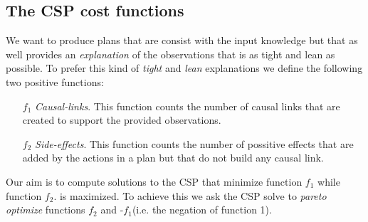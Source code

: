 \documentclass{ecai}
\newcommand{\cond}{\mathsf{cond}}  %
\newcommand{\start}{\mathsf{start}}%
\newcommand{\en}{\mathsf{end}}     %
\newcommand{\reqs}{\mathsf{req\_{start}}} %
\newcommand{\reqe}{\mathsf{req\_{end}}}   %
\begin{document}

\subsection{The CSP cost functions}
We want to produce plans that are consist with the input knowledge but that as well provides an {\em explanation} of the observations that is as tight and lean as possible. To prefer this kind of {\em tight} and {\em lean} explanations we define the following two positive functions:
\begin{enumerate}
\item[$f_1$] {\em Causal-links}. This function counts the number of causal links that are created to support the provided observations.
\item[$f_2$] {\em Side-effects}. This function counts the number of possitive effects that are added by the actions in a plan but that do not build any causal link.  
\end{enumerate}

Our aim is to compute solutions to the CSP that minimize function $f_1$ while function $f_2$. is maximized. To achieve this we ask the CSP solve to {\em pareto optimize} functions $f_2$ and -$f_1$(i.e. the negation of function 1). 
  
\end{document}
